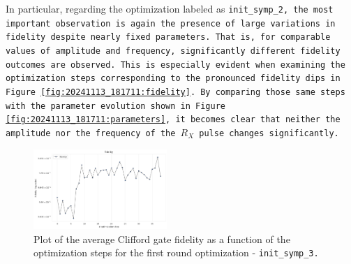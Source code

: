 In particular, regarding the optimization labeled as \tt{init\_symp\_2}, the most important observation is again the presence of large variations in fidelity despite nearly fixed parameters. 
That is, for comparable values of amplitude and frequency, significantly different fidelity outcomes are observed.
This is especially evident when examining the optimization steps corresponding to the pronounced fidelity dips in Figure \ref{fig:20241113_181711:fidelity}.
By comparing those same steps with the parameter evolution shown in Figure \ref{fig:20241113_181711:parameters}, it becomes clear that neither the amplitude nor the frequency of the $R_X$ pulse changes significantly.

\begin{figure}[h!]
    \centering
    \includegraphics[width=0.45\textwidth]{figures/png/RB_optimization/NM/InitialSymplex/20241113_200745/fidelity.png}
    \caption{Plot of the average Clifford gate fidelity as a function of the optimization steps for the first round optimization - \tt{init\_symp\_3}.}
    \label{fig:20241113_200745:fidelity}
\end{figure}

